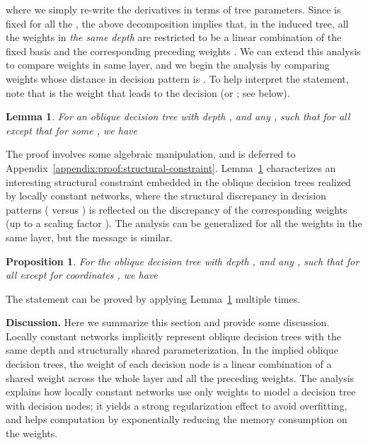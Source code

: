 \documentclass{article} \usepackage{iclr2020_conference,times}
\newtheorem{lemma}[theorem]{Lemma}
\newtheorem{proposition}[theorem]{Proposition}
\begin{document}
where we simply re-write the derivatives in terms of tree parameters. Since  is fixed for all the , the above decomposition implies that, in the induced tree, all the weights  in \emph{the same depth}  are restricted to be a linear combination of the fixed basis  and the corresponding preceding weights .\!
We can extend this analysis to compare weights in same layer, and we begin the analysis by comparing weights whose  distance in decision pattern is . 
To help interpret the statement, note that  is the weight 
that leads to the decision  (or ; see below).
\begin{lemma}
For an oblique decision tree with depth ,  and any ,  such that  for all  except that  for some , we have
\vspace{-1mm}

\vspace{-6mm}
\label{lemma:structural-constraint}
\end{lemma}
The proof involves some algebraic manipulation, and is deferred to Appendix~\ref{appendix:proof:structural-constraint}. Lemma~\ref{lemma:structural-constraint} characterizes an interesting structural constraint embedded in the oblique decision trees realized by locally constant networks, where the structural discrepancy  in decision patterns ( versus ) is reflected on the discrepancy of the corresponding weights (up to a scaling factor ). The analysis can be generalized for all the weights in the same layer, but the message is similar. 
\begin{proposition}
For the oblique decision tree with depth ,  and any ,  such that  for all  except for  coordinates , we have
\vspace{-1mm}

\vspace{-6mm}
\label{prop:structural-constraint}
\end{proposition}
The statement can be proved by applying Lemma~\ref{lemma:structural-constraint} multiple times. 

\textbf{Discussion.}
Here we summarize this section and provide some discussion.
Locally constant networks implicitly represent oblique decision trees with the same depth and structurally shared parameterization. In the implied oblique decision trees, the weight of each decision node is a linear combination of a shared weight across the whole layer and all the preceding weights. The analysis explains how locally constant networks use only  weights to model a decision tree with  decision nodes; it yields a strong regularization effect to avoid overfitting, and helps computation by exponentially reducing the memory consumption on the weights. 
\end{document}
